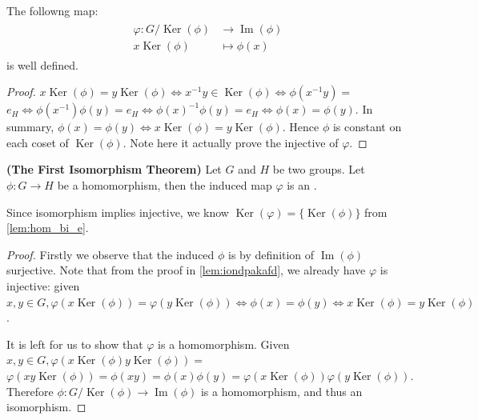 \documentclass{article}
\newcommand{\bfs}[1]{\textbf{({#1}) }}
\newcommand{\Ker}{\operatorname{Ker}}
\begin{document}
\begin{lema}
The followng map:
\begin{align*}
\begin{aligned}
\varphi: G /\Ker(\phi) & \rightarrow \operatorname{Im}(\phi) \\
x \Ker(\phi) & \mapsto \phi(x)
\end{aligned}
\end{align*}
is well defined.
\end{lema}\label{lem:iondpakafd}
\begin{proof}
 $x \operatorname{Ker}(\phi)=y \operatorname{Ker}(\phi) \Longleftrightarrow x^{-1} y \in \operatorname{Ker}(\phi) \Longleftrightarrow \phi\left(x^{-1} y\right)=$
$e_{H} \Longleftrightarrow \phi\left(x^{-1}\right) \phi(y)=e_{H} \Longleftrightarrow \phi(x)^{-1} \phi(y)=e_{H} \Longleftrightarrow \phi(x)=\phi(y) .$ In summary,
$\phi(x)=\phi(y) \Longleftrightarrow x \operatorname{Ker}(\phi)=y \operatorname{Ker}(\phi)$. Hence $\phi$ is constant on each coset of $\operatorname{Ker}(\phi) .$ Note here it actually prove the injective of $\varphi$.
\end{proof}
\begin{thma}{\bfs{The First Isomorphism Theorem}}\label{thm:odndcadc}
 Let $G$ and $H$ be two groups. Let $\phi: G \rightarrow H$ be a homomorphism, then the induced map $\varphi$
is an .
\end{thma}
\begin{rema}
Since isomorphism implies injective, we know $\Ker(\varphi)=\{\Ker(\phi)\}$ from \cref{lem:hom_bi_e}.
\end{rema}
\begin{proof}
Firstly we observe that the induced $\phi$ is by definition of $\operatorname{Im}(\phi)$ surjective. Note that from the proof in \cref{lem:iondpakafd}, we already have $\varphi$ is injective: given $x, y \in G, \varphi(x \operatorname{Ker}(\phi))=\varphi(y \operatorname{Ker}(\phi)) \Longleftrightarrow \phi(x)=\phi(y) \Longleftrightarrow x \operatorname{Ker}(\phi)=y \operatorname{Ker}(\phi)$.

It is left for us to show that $\varphi$ is a homomorphism. Given $x, y \in G, \varphi(x \operatorname{Ker}(\phi) y \operatorname{Ker}(\phi))=$ $\varphi(x y \operatorname{Ker}(\phi))=\phi(x y)=\phi(x) \phi(y)=\varphi(x \operatorname{Ker}(\phi)) \varphi(y \operatorname{Ker}(\phi)) .$
Therefore $\phi: G / \operatorname{Ker}(\phi) \rightarrow \operatorname{Im}(\phi)$ is a homomorphism, and thus an isomorphism.
\end{proof} 
\end{document}
